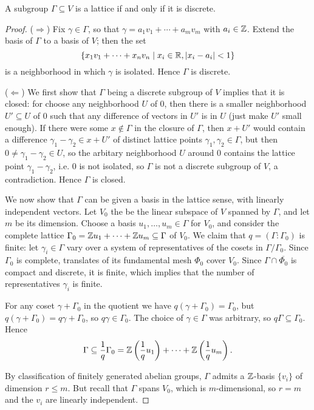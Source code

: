 \begin{prop}
	A subgroup $\Gamma\subseteq V$ is a lattice if and only if it is discrete.
\end{prop}
\begin{proof}
	($\Longrightarrow$) Fix $\gamma\in\Gamma$, so that $\gamma=a_1v_1+\cdots+a_mv_m$ with $a_i\in\mathbb{Z}$. Extend the basis of $\Gamma$ to a basis of $V$; then the set
	\[
		\{x_1v_1 + \cdots + x_nv_n \mid x_i\in\mathbb{R}, |x_i-a_i|<1\}
	\]
	is a neighborhood in which $\gamma$ is isolated. Hence $\Gamma$ is discrete.

	($\Longleftarrow$) We first show that $\Gamma$ being a discrete subgroup of $V$ implies that it is closed: for choose any neighborhood $U$ of 0, then there is a smaller neighborhood $U'\subseteq U$ of 0 such that any difference of vectors in $U'$ is in $U$ (just make $U'$ small enough). If there were some $x\notin\Gamma$ in the closure of $\Gamma$, then $x+U'$ would contain a difference $\gamma_1-\gamma_2\in x+U'$ of distinct lattice points $\gamma_1,\gamma_2\in\Gamma$, but then $0\neq \gamma_1-\gamma_2\in U$, so the arbitary neighborhood $U$ around 0 contains the lattice point $\gamma_1-\gamma_2$, i.e. 0 is not isolated, so $\Gamma$ is not a discrete subgroup of $V$, a contradiction. Hence $\Gamma$ is closed.

	We now show that $\Gamma$ can be given a basis in the lattice sense, with linearly independent vectors. Let $V_0$ the be the linear subspace of $V$ spanned by $\Gamma$, and let $m$ be its dimension. Choose a basis $u_1,\dots,u_m\in\Gamma$ for $V_0$, and consider the complete lattice $\Gamma_0 = \mathbb{Z} u_1 + \cdots + \mathbb{Z} u_m \subseteq\Gamma$ of $V_0$. We claim that $q=(\Gamma:\Gamma_0)$ is finite: let $\gamma_i\in\Gamma$ vary over a system of representatives of the cosets in $\Gamma/\Gamma_0$. Since $\Gamma_0$ is complete, translates of its fundamental mesh $\Phi_0$ cover $V_0$. Since $\Gamma\cap\overline{\Phi_0}$ is compact and discrete, it is finite, which implies that the number of representatives $\gamma_i$ is finite.

	For any coset $\gamma+\Gamma_0$ in the quotient we have $q(\gamma+\Gamma_0)=\Gamma_0$, but $q(\gamma+\Gamma_0)=q\gamma+\Gamma_0$, so $q\gamma\in\Gamma_0$. The choice of $\gamma\in\Gamma$ was arbitrary, so $q\Gamma\subseteq\Gamma_0$. Hence
	\[
		\Gamma\subseteq\frac{1}{q}\Gamma_0 = \mathbb{Z}\left(\frac{1}{q}u_1\right) + \cdots + \mathbb{Z}\left(\frac{1}{q}u_m\right).
	\]

	By classification of finitely generated abelian groups, $\Gamma$ admits a $\mathbb{Z}$-basis $\{v_i\}$ of dimension $r\leq m$. But recall that $\Gamma$ spans $V_0$, which is $m$-dimensional, so $r=m$ and the $v_i$ are linearly independent.
\end{proof}

